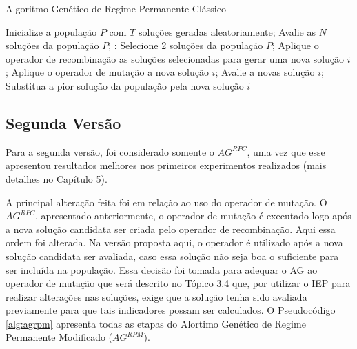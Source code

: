 \begin{algorithm}[H]
  \caption{Algoritmo Genético de Regime Permanente Clássico}
  \label{alg:agrpc}
  \begin{algorithmic}
    \State Inicialize a população $P$ com $T$ soluções geradas aleatoriamente;
    \State Avalie as $N$ soluções da população $P$;
       \State:
        \State Selecione 2 soluções da população $P$;
        \State Aplique o operador de recombinação as soluções selecionadas para gerar uma nova solução $i$;
        \State Aplique o operador de mutação a nova solução $i$;
        \State Avalie a novas solução $i$;
          \State Substitua a pior solução da população pela nova solução $i$	
        \EndIf
      \EndFor
    \EndWhile
  \end{algorithmic}
\end{algorithm}

\subsection{Segunda Versão}
\label{ch:3_SegundaVersao}
Para a segunda versão, foi considerado somente o $AG^{RPC}$, uma vez que esse apresentou resultados melhores nos primeiros experimentos realizados (mais detalhes no Capítulo 5). 

A principal alteração feita foi em relação ao uso do operador de mutação. O $AG^{RPC}$, apresentado anteriormente, o operador de mutação é executado logo após a nova solução candidata ser criada pelo operador de recombinação. Aqui essa ordem foi alterada. Na versão proposta aqui, o operador é utilizado após a nova solução candidata ser avaliada, caso essa solução não seja boa o suficiente para ser incluída na população. Essa decisão foi tomada para adequar o AG ao operador de mutação que será descrito no Tópico 3.4 que, por utilizar o IEP para realizar alterações nas soluções, exige que a solução tenha sido avaliada previamente para que tais indicadores possam ser calculados. O Pseudocódigo \ref{alg:agrpm} apresenta todas as etapas do Alortimo Genético de Regime Permanente Modificado ($AG^{RPM}$).

